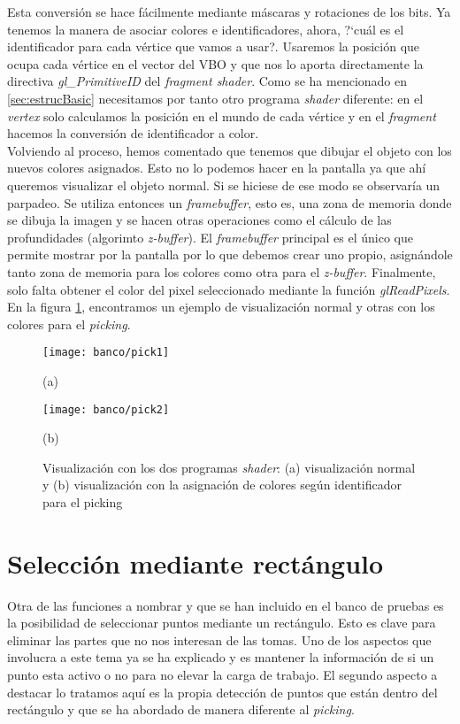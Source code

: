Esta conversión se hace fácilmente mediante máscaras y rotaciones de los bits. Ya tenemos la manera de asociar colores e identificadores, ahora, ?`cuál es el identificador para cada vértice que vamos a usar?. Usaremos la posición que ocupa cada vértice en el vector del VBO y que nos lo aporta directamente la directiva \textit{gl\_PrimitiveID} del \textit{fragment shader}. Como se ha mencionado en \ref{sec:estrucBasic} necesitamos por tanto otro programa \textit{shader} diferente: en el \textit{vertex} solo calculamos la posición en el mundo de cada vértice y en el \textit{fragment} hacemos la conversión de identificador a color. \\

Volviendo al proceso, hemos comentado que tenemos que dibujar el objeto con los nuevos colores asignados. Esto no lo podemos hacer en la pantalla ya que ahí queremos visualizar el objeto normal. Si se hiciese de ese modo se observaría un parpadeo. Se utiliza entonces un \textit{framebuffer}, esto es, una zona de memoria donde se dibuja la imagen y se hacen otras operaciones como el cálculo de las profundidades (algorimto \textit{z-buffer}). El \textit{framebuffer} principal es el único que permite mostrar por la pantalla por lo que debemos crear uno propio, asignándole tanto zona de memoria para los colores como otra para el \textit{z-buffer}. Finalmente, solo falta obtener el color del pixel seleccionado mediante la función \textit{glReadPixels}. En la figura \ref{fig:shaders}, encontramos un ejemplo de visualización normal y otras con los colores para el \textit{picking}.

\begin{figure}[h!]
	\begin{minipage}{0.5\textwidth}
		\centering
		\texttt{[image: banco/pick1]} 
		\caption*{(a)}
	\end{minipage}
	\begin{minipage}{0.5\textwidth}
		\centering
		\texttt{[image: banco/pick2]} 
			\caption*{(b)}
	\end{minipage}
	\caption{Visualización con los dos programas \textit{shader}: (a) visualización normal y (b) visualización con la asignación de colores según identificador para el picking}
	\label{fig:shaders}
\end{figure}

\section{Selección mediante rectángulo}\label{sec:selecRec}
Otra de las funciones a nombrar y que se han incluido en el banco de pruebas es la posibilidad de seleccionar puntos mediante un rectángulo. Esto es clave para eliminar las partes que no nos interesan de las tomas. Uno de los aspectos que involucra a este tema ya se ha explicado y es mantener la información de si un punto esta activo o no para no elevar la carga de trabajo. El segundo aspecto a destacar lo tratamos aquí es la propia detección de puntos que están dentro del rectángulo y que se ha abordado de manera diferente al \textit{picking}.\\

